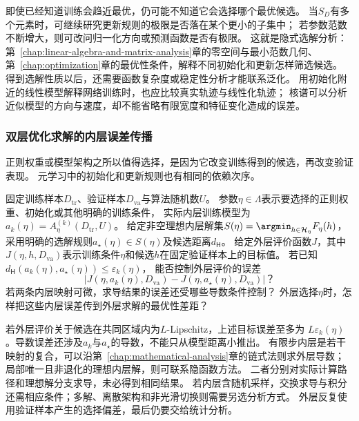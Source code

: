 即使已经知道训练会趋近最优，仍可能不知道它会选择哪个最优候选。
当$S_D$有多个元素时，可继续研究更新规则的极限是否落在某个更小的子集中；
若参数范数不断增大，则可改问归一化方向或预测函数是否有极限。
这就是隐式选解分析：第~\ref{chap:linear-algebra-and-matrix-analysis}章的零空间与最小范数几何、
第~\ref{chap:optimization}章的最优性条件，解释不同初始化和更新怎样筛选候选。
得到选解性质以后，还需要函数复杂度或稳定性分析才能联系泛化。
用初始化附近的线性模型解释网络训练时，也应比较真实轨迹与线性化轨迹；
核谱可以分析近似模型的方向与速度，却不能省略有限宽度和特征变化造成的误差。

\subsubsection{双层优化求解的内层误差传播}
\label{sec:future-analysis-nested-learning}

正则权重或模型架构之所以值得选择，是因为它改变训练得到的候选，再改变验证表现。
元学习中的初始化和更新规则也有相同的依赖次序。

\begin{mathproblem}[内层求解误差对外层目标与导数的影响]
  \label{question:future-nested-learning}
  固定训练样本$D_{\mathrm{tr}}$、验证样本$D_{\mathrm{va}}$与算法随机数$U$。
  参数$\eta\in\Lambda$表示要选择的正则权重、初始化或其他明确的训练条件，
  实际内层训练模型为$a_k(\eta)=A_\eta^{(k)}(D_{\mathrm{tr}},U)$。
  给定非空理想内层解集$S(\eta)=\argmin_{h\in\mathcal H_\eta}F_\eta(h)$，
  采用明确的选解规则$a_\star(\eta)\in S(\eta)$及候选距离$d_{\mathsf H}$。
  给定外层评价函数$J$，其中$J(\eta,h,D_{\mathrm{va}})$表示训练条件$\eta$和候选$h$在固定验证样本上的目标值。
  若已知$d_{\mathsf H}(a_k(\eta),a_\star(\eta))\leq\varepsilon_k(\eta)$，
  能否控制外层评价的误差
  \[
    \left|J(\eta,a_k(\eta),D_{\mathrm{va}})
          -J(\eta,a_\star(\eta),D_{\mathrm{va}})\right|\text{？}
  \]
  若两条内层映射可微，求导结果的误差还受哪些导数条件控制？
  外层选择$\eta$时，怎样把这些内层误差传到外层求解的最优性差距？
\end{mathproblem}

若外层评价关于候选在共同区域内为$L$-Lipschitz，上述目标误差至多为
$L\varepsilon_k(\eta)$。导数误差还涉及$a_k$与$a_\star$的导数，不能只从模型距离小推出。
有限步内层是若干映射的复合，可以沿第~\ref{chap:mathematical-analysis}章的链式法则求外层导数；
局部唯一且非退化的理想内层解，则可联系隐函数方法。
二者分别对实际计算路径和理想解分支求导，未必得到相同结果。
若内层含随机采样，交换求导与积分还需相应条件；多解、离散架构和非光滑切换则需要另选分析方式。
外层反复使用验证样本产生的选择偏差，最后仍要交给统计分析。

